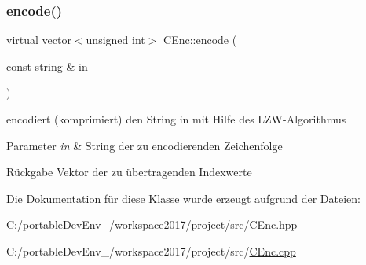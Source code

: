 \subsubsection{\texorpdfstring{encode()}{encode()}}
{\footnotesize\ttfamily virtual vector$<$unsigned int$>$ C\+Enc\+::encode (\begin{DoxyParamCaption}\item[{const string \&}]{in }\end{DoxyParamCaption})\hspace{0.3cm}{\ttfamily [pure virtual]}}

encodiert (komprimiert) den String in mit Hilfe des L\+Z\+W-\/\+Algorithmus 
\begin{DoxyParams}{Parameter}
{\em in} & String der zu encodierenden Zeichenfolge \\
\hline
\end{DoxyParams}
\begin{DoxyReturn}{Rückgabe}
Vektor der zu übertragenden Indexwerte 
\end{DoxyReturn}


Die Dokumentation für diese Klasse wurde erzeugt aufgrund der Dateien\+:\begin{DoxyCompactItemize}
\item 
C\+:/portable\+Dev\+Env\+\_/workspace2017/project/src/\hyperlink{_c_enc_8hpp}{C\+Enc.\+hpp}\item 
C\+:/portable\+Dev\+Env\+\_/workspace2017/project/src/\hyperlink{_c_enc_8cpp}{C\+Enc.\+cpp}\end{DoxyCompactItemize}
